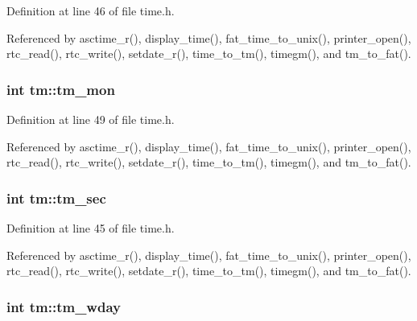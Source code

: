 Definition at line 46 of file time.\-h.



Referenced by asctime\-\_\-r(), display\-\_\-time(), fat\-\_\-time\-\_\-to\-\_\-unix(), printer\-\_\-open(), rtc\-\_\-read(), rtc\-\_\-write(), setdate\-\_\-r(), time\-\_\-to\-\_\-tm(), timegm(), and tm\-\_\-to\-\_\-fat().

\hypertarget{structtm_a112ac36fa2f593777138a417cf031e17}{
\subsubsection[{tm\-\_\-mon}]{\setlength{\rightskip}{0pt plus 5cm}int tm\-::tm\-\_\-mon}}\label{structtm_a112ac36fa2f593777138a417cf031e17}


Definition at line 49 of file time.\-h.



Referenced by asctime\-\_\-r(), display\-\_\-time(), fat\-\_\-time\-\_\-to\-\_\-unix(), printer\-\_\-open(), rtc\-\_\-read(), rtc\-\_\-write(), setdate\-\_\-r(), time\-\_\-to\-\_\-tm(), timegm(), and tm\-\_\-to\-\_\-fat().

\hypertarget{structtm_a4d098a9a5c03a00b2ee61e10851de81e}{
\subsubsection[{tm\-\_\-sec}]{\setlength{\rightskip}{0pt plus 5cm}int tm\-::tm\-\_\-sec}}\label{structtm_a4d098a9a5c03a00b2ee61e10851de81e}


Definition at line 45 of file time.\-h.



Referenced by asctime\-\_\-r(), display\-\_\-time(), fat\-\_\-time\-\_\-to\-\_\-unix(), printer\-\_\-open(), rtc\-\_\-read(), rtc\-\_\-write(), setdate\-\_\-r(), time\-\_\-to\-\_\-tm(), timegm(), and tm\-\_\-to\-\_\-fat().

\hypertarget{structtm_afe81a8c46f1c693c43f259b288859f4f}{
\subsubsection[{tm\-\_\-wday}]{\setlength{\rightskip}{0pt plus 5cm}int tm\-::tm\-\_\-wday}}\label{structtm_afe81a8c46f1c693c43f259b288859f4f}


